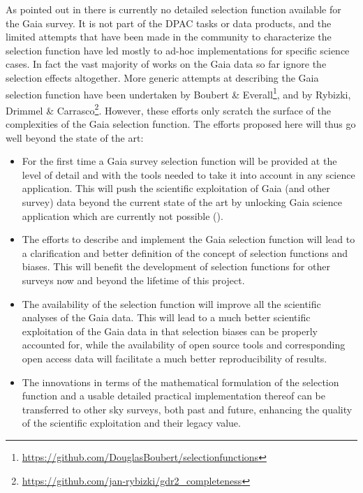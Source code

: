 As pointed out in  there is currently no detailed selection function available for the Gaia survey. It is not part of the DPAC tasks or data products, and the limited attempts that have been made in the community to characterize the selection function have led mostly to ad-hoc implementations for specific science cases. In fact the vast majority of works on the Gaia data so far ignore the selection effects altogether. More generic attempts at describing the Gaia selection function have been undertaken by Boubert \& Everall\footnote{\url{https://github.com/DouglasBoubert/selectionfunctions}}, and by Rybizki, Drimmel \& Carrasco\footnote{\url{https://github.com/jan-rybizki/gdr2_completeness}}. However, these efforts only scratch the surface of the complexities of the Gaia selection function. The efforts proposed here will thus go well beyond the state of the art:
\begin{itemize}
    \item For the first time a Gaia survey selection function will be provided at the level of detail and with the tools needed to take it into account in any science application. This will push the scientific exploitation of Gaia (and other survey) data beyond the current state of the art by unlocking Gaia science application which are currently not possible ().
    \item The efforts to describe and implement the Gaia selection function will lead to a clarification and better definition of the concept of selection functions and biases. This will benefit the development of selection functions for other surveys now and beyond the lifetime of this project.
    \item The availability of the selection function will improve all the scientific analyses of the Gaia data. This will lead to a much better scientific exploitation of the Gaia data in that selection biases can be properly accounted for, while the availability of open source tools and corresponding open access data will facilitate a much better reproducibility of results.
    \item The innovations in terms of the mathematical formulation of the selection function and a usable detailed practical implementation thereof can be transferred to other sky surveys, both past and future, enhancing the quality of the scientific exploitation and their legacy value.
\end{itemize}


